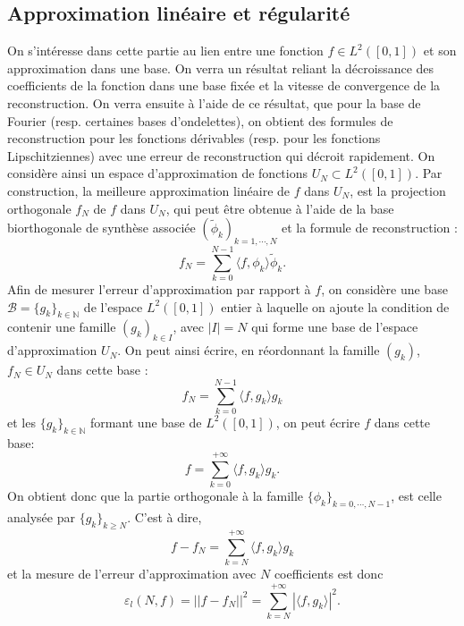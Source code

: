 \subsection{Approximation linéaire et régularité}
On s'intéresse dans cette partie au lien entre une fonction $f\in L^2([0, 1])$ et son approximation dans une base. On verra un résultat reliant la décroissance des coefficients de la fonction dans une base fixée et la vitesse de convergence de la reconstruction. 
On verra ensuite à l'aide de ce résultat, que pour la base de Fourier (resp. certaines bases d'ondelettes), on obtient des formules de reconstruction pour les fonctions dérivables (resp. pour les fonctions Lipschitziennes) avec une erreur de reconstruction qui décroit rapidement.
\newline 
On considère ainsi un espace d'approximation de fonctions $U_N \subset L^2([0, 1])$.
Par construction, la meilleure approximation linéaire de $f$ dans $U_N$, est la projection orthogonale $f_N$ de $f$ dans $U_N$, qui peut être obtenue à l'aide de la base biorthogonale de synthèse associée $(\tilde{\phi}_k)_{k=1, \cdots, N}$ et la formule de reconstruction :
\begin{equation}
	f_N = \sum_{k=0}^{N-1}\langle f, \phi_k \rangle \tilde{\phi}_k.
\end{equation}
Afin de mesurer l'erreur d'approximation par rapport à $f$, on considère une base $\mathcal{B} = \{g_k\}_{k\in \mathbb{N}}$ de l'espace $L^2([0, 1])$ entier à laquelle on ajoute la condition de contenir une famille $(g_k)_{k\in I}$, avec $|I| = N$ qui forme une base de l'espace d'approximation $U_N$.
On peut ainsi écrire, en réordonnant la famille $(g_k)$,  $f_N \in U_N$ dans cette base :
\begin{equation}
	f_N = \sum_{k=0}^{N-1} \langle f, g_k \rangle g_k 
\end{equation}
et les $\{g_k\}_{k\in\mathbb{N}}$ formant une base de $L^2([0, 1])$, on peut écrire $f$ dans cette base:
\begin{equation}
	f = \sum_{k=0}^{+\infty} \langle f, g_k \rangle g_k.
\end{equation}
On obtient donc que la partie orthogonale à la famille $\{\phi_k\}_{k=0, \cdots, N-1}$, est celle analysée par $\{g_k\}_{k\geq N}$.
C'est à dire, 
\begin{equation}
	f - f_N = \sum_{k=N}^{+\infty} \langle f, g_k \rangle g_k 
\end{equation}
et la mesure de l'erreur d'approximation avec $N$ coefficients est donc 
\begin{equation}
	\varepsilon_l(N, f) = ||f-f_N||^2 = \sum_{k=N}^{+\infty} |\langle f, g_k\rangle|^2.
\end{equation}
